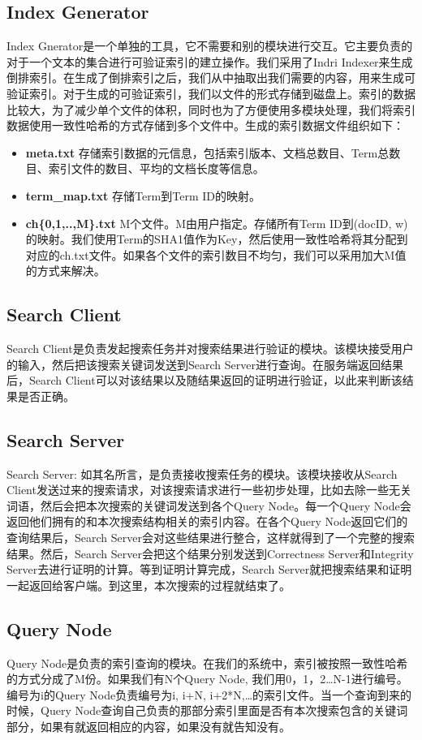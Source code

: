 \subsection{Index Generator}
Index Gnerator是一个单独的工具，它不需要和别的模块进行交互。它主要负责的对于一个文本的集合进行可验证索引的建立操作。我们采用了Indri Indexer\cite{Indri}来生成倒排索引。在生成了倒排索引之后，我们从中抽取出我们需要的内容，用来生成可验证索引。对于生成的可验证索引，我们以文件的形式存储到磁盘上。索引的数据比较大，为了减少单个文件的体积，同时也为了方便使用多模块处理，我们将索引数据使用一致性哈希的方式存储到多个文件中。生成的索引数据文件组织如下：
\begin{itemize}
\item \textbf{meta.txt} 存储索引数据的元信息，包括索引版本、文档总数目、Term总数目、索引文件的数目、平均的文档长度等信息。
\item \textbf{term\_map.txt} 存储Term到Term ID的映射。
\item \textbf{ch\{0,1,..,M\}.txt} M个文件。M由用户指定。存储所有Term ID到(docID, w)的映射。我们使用Term的SHA1值作为Key，然后使用一致性哈希将其分配到对应的ch.txt文件。如果各个文件的索引数目不均匀，我们可以采用加大M值的方式来解决。
\end{itemize}

\subsection{Search Client}
Search Client是负责发起搜索任务并对搜索结果进行验证的模块。该模块接受用户的输入，然后把该搜索关键词发送到Search Server进行查询。在服务端返回结果后，Search Client可以对该结果以及随结果返回的证明进行验证，以此来判断该结果是否正确。

\subsection{Search Server}
Search Server: 如其名所言，是负责接收搜索任务的模块。该模块接收从Search Client发送过来的搜索请求，对该搜索请求进行一些初步处理，比如去除一些无关词语，然后会把本次搜索的关键词发送到各个Query Node。每一个Query Node会返回他们拥有的和本次搜索结构相关的索引内容。在各个Query Node返回它们的查询结果后，Search Server会对这些结果进行整合，这样就得到了一个完整的搜索结果。然后，Search Server会把这个结果分别发送到Correctness Server和Integrity Server去进行证明的计算。等到证明计算完成，Search Server就把搜索结果和证明一起返回给客户端。到这里，本次搜索的过程就结束了。

\subsection{Query Node}
Query Node是负责的索引查询的模块。在我们的系统中，索引被按照一致性哈希的方式分成了M份。如果我们有N个Query Node, 我们用0，1，2…N-1进行编号。编号为i的Query Node负责编号为i, i+N, i+2*N,…的索引文件。当一个查询到来的时候，Query Node查询自己负责的那部分索引里面是否有本次搜索包含的关键词部分，如果有就返回相应的内容，如果没有就告知没有。

